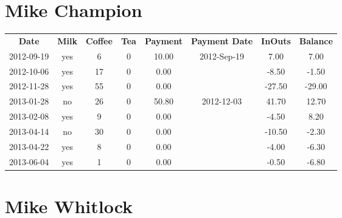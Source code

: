 \section{Mike Champion}

\begin{center}
\begin{tabular}{cccccccc}
\textbf{Date} & \textbf{Milk} & \textbf{Coffee} & \textbf{Tea} & \textbf{Payment} & \textbf{Payment Date} & \textbf{InOuts} & \textbf{Balance} \\
2012-09-19 & yes &  6 & 0 & 10.00 & 2012-Sep-19 &   7.00 &   7.00\\ 
2012-10-06 & yes & 17 & 0 &  0.00 &  &  -8.50 &  -1.50\\ 
2012-11-28 & yes & 55 & 0 &  0.00 &  & -27.50 & -29.00\\ 
2013-01-28 & no & 26 & 0 & 50.80 & 2012-12-03 &  41.70 &  12.70\\ 
2013-02-08 & yes &  9 & 0 &  0.00 &  &  -4.50 &   8.20\\ 
2013-04-14 & no & 30 & 0 &  0.00 &  & -10.50 &  -2.30\\ 
2013-04-22 & yes &  8 & 0 &  0.00 &  &  -4.00 &  -6.30\\ 
2013-06-04 & yes &  1 & 0 &  0.00 &  &  -0.50 &  -6.80
\end{tabular}
\end{center}

\section{Mike Whitlock}

